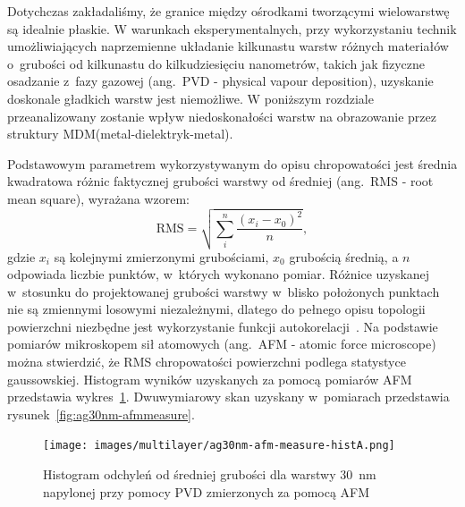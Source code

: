 Dotychczas zakładaliśmy, że granice między ośrodkami tworzącymi wielowarstwę są idealnie płaskie. W warunkach eksperymentalnych, przy wykorzystaniu technik umożliwiających naprzemienne układanie kilkunastu warstw różnych materiałów o~grubości od kilkunastu do kilkudziesięciu nanometrów,  takich jak fizyczne osadzanie z~fazy gazowej (ang.~PVD - physical vapour deposition), uzyskanie doskonale gładkich warstw jest niemożliwe. W poniższym rozdziale przeanalizowany zostanie wpływ niedoskonałości warstw na obrazowanie przez struktury MDM(metal-dielektryk-metal).

Podstawowym parametrem wykorzystywanym do opisu chropowatości jest średnia kwadratowa różnic faktycznej grubości warstwy od średniej (ang.~RMS - root mean square), wyrażana wzorem:
\begin{equation}
\textrm{RMS}=\sqrt{\sum_i^n \frac{(x_i -x_0)^2}{n}},
\end{equation}
gdzie $x_i$ są kolejnymi zmierzonymi grubościami, $x_0$ grubością średnią, a $n$ odpowiada liczbie punktów, w~których wykonano pomiar. Różnice uzyskanej w~stosunku do projektowanej grubości warstwy w~blisko położonych punktach nie są zmiennymi losowymi niezależnymi, dlatego do pełnego opisu topologii powierzchni niezbędne jest wykorzystanie funkcji autokorelacji~\cite{stefaniuk2011effect}. Na podstawie pomiarów mikroskopem sił atomowych (ang.~AFM - atomic force microscope) można stwierdzić, że RMS chropowatości powierzchni podlega statystyce gaussowskiej. Histogram wyników uzyskanych za pomocą pomiarów AFM przedstawia wykres~\ref{fig:ag30nm-afmhist}. Dwuwymiarowy skan uzyskany w~pomiarach przedstawia rysunek~\ref{fig:ag30nm-afmmeasure}.

\begin{figure}[htb]
		\texttt{[image: images/multilayer/ag30nm-afm-measure-histA.png]}
		\caption{Histogram odchyleń od średniej grubości dla warstwy $30$~nm napylonej przy pomocy PVD zmierzonych za pomocą AFM} 		\label{fig:ag30nm-afmhist}
\end{figure}

